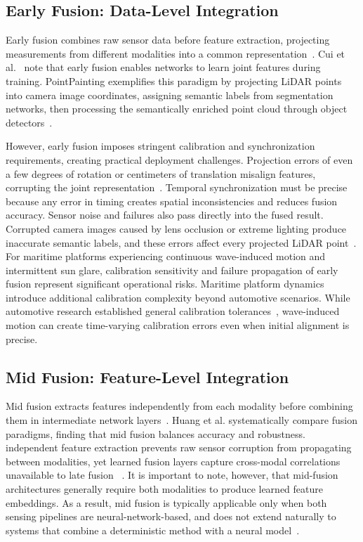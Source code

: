 \documentclass{erauthesis}
\begin{document}
\subsection{Early Fusion: Data-Level Integration}

Early fusion combines raw sensor data before feature extraction, projecting measurements from different modalities into a common representation~\cite{cui2022}.
Cui et al.~\cite{cui2022} note that early fusion enables networks to learn joint features during training.
PointPainting exemplifies this paradigm by projecting \ac{LiDAR} points into camera image coordinates, assigning semantic labels from segmentation networks, then processing the semantically enriched point cloud through object detectors~\cite{cui2022}.

However, early fusion imposes stringent calibration and synchronization requirements, creating practical deployment challenges.
Projection errors of even a few degrees of rotation or centimeters of translation misalign features, corrupting the joint representation~\cite{cui2022}.
Temporal synchronization must be precise because any error in timing creates spatial inconsistencies and reduces fusion accuracy. Sensor noise and failures also pass directly into the fused result. Corrupted camera images caused by lens occlusion or extreme lighting produce inaccurate semantic labels, and these errors affect every projected LiDAR point~\cite{cui2022}.
For maritime platforms experiencing continuous wave-induced motion and intermittent sun glare, calibration sensitivity and failure propagation of early fusion represent significant operational risks.
Maritime platform dynamics introduce additional calibration complexity beyond automotive scenarios.
While automotive research established general calibration tolerances~\cite{cui2022}, wave-induced motion can create time-varying calibration errors even when initial alignment is precise.

\subsection{Mid Fusion: Feature-Level Integration}

Mid fusion extracts features independently from each modality before combining them in intermediate network layers~\cite{huang2024}.
Huang et al. systematically compare fusion paradigms, finding that mid fusion balances accuracy and robustness. independent feature extraction prevents raw sensor corruption from propagating between modalities, yet learned fusion layers capture cross-modal correlations unavailable to late fusion ~\cite{huang2024}.
It is important to note, however, that mid-fusion architectures generally require both modalities to produce learned feature embeddings. As a result, mid fusion is typically applicable only when both sensing pipelines are neural-network-based, and does not extend naturally to systems that combine a deterministic method with a neural model~\cite{baltruvsaitis2018}.
\end{document}
